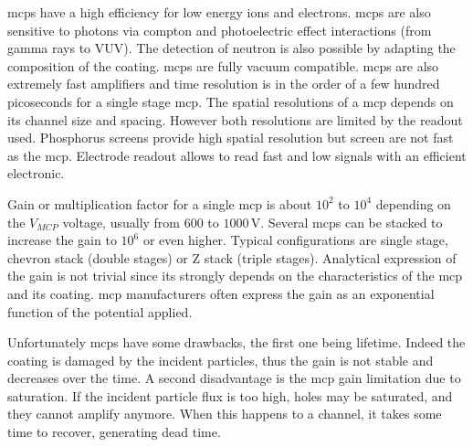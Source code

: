 \begin{refsection}
  \acrshort{mcp}s have a high efficiency for low energy ions and electrons. \acrshort{mcp}s are also sensitive to photons via compton and photoelectric effect interactions (from gamma rays to VUV). The detection of neutron is  also possible by adapting the composition of the coating. \acrshort{mcp}s are fully vacuum compatible. \acrshort{mcp}s are also extremely fast amplifiers and time resolution is in the order of a few hundred picoseconds for a single stage \acrshort{mcp}. The spatial resolutions of a \acrshort{mcp} depends on its channel size and spacing. However both resolutions are limited by the readout used. Phosphorus screens provide high spatial resolution but screen are not fast as the \acrshort{mcp}. Electrode readout allows to read fast and low signals with an efficient electronic. 

  

  Gain or multiplication factor for a single \acrshort{mcp} is about $10^{2}$ to $10^{4}$ depending on the $V_{MCP}$ voltage, usually from $600$ to $1000\,\mathrm{V}$. Several \acrshort{mcp}s can be stacked to increase the gain to $10^{6}$ or even higher. Typical configurations are single stage, chevron stack (double stages) or Z stack (triple stages). Analytical expression of the gain is not trivial since its strongly depends on the characteristics of the \acrshort{mcp} and its coating. \acrshort{mcp} manufacturers often express the gain as an exponential function of the potential applied.

  

  Unfortunately \acrshort{mcp}s have some drawbacks, the first one being lifetime. Indeed the coating is damaged by the incident particles, thus the gain is not stable and decreases over the time. A second disadvantage is the \acrshort{mcp} gain limitation due to saturation. If the incident particle flux is too high, holes may be saturated, and they cannot amplify anymore. When this happens to a channel, it takes some time to recover, generating dead time.



\end{refsection}
